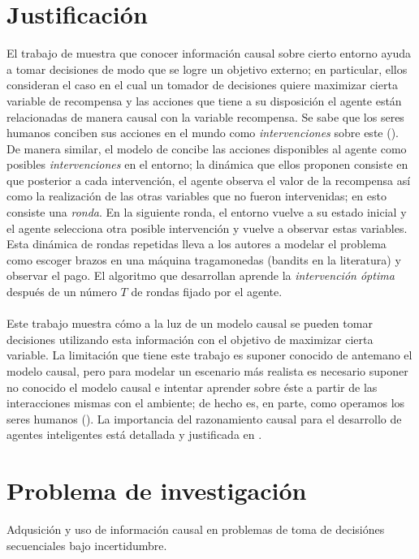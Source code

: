 \documentclass[11pt]{article}
\theoremstyle{plain}
\begin{document}
\section{Justificación}
El trabajo de \cite{lattimoreNIPS2016} muestra que conocer información causal sobre cierto entorno ayuda a tomar decisiones de modo que se logre un objetivo externo; en particular, ellos consideran el caso en el cual un tomador de decisiones quiere maximizar cierta variable de recompensa y las acciones que tiene a su disposición el agente están relacionadas de manera causal con la variable recompensa. Se sabe que los seres humanos conciben sus acciones en el mundo como \textit{intervenciones} sobre este (\cite{hagmayer2009decision}). De manera similar, el modelo de \cite{lattimoreNIPS2016} concibe las acciones disponibles al agente como posibles \textit{intervenciones} en el entorno; la dinámica que ellos proponen consiste en que posterior a cada intervención, el agente observa el valor de la recompensa así como la realización de las otras variables que no fueron intervenidas; en esto consiste una \textit{ronda}. En la siguiente ronda, el entorno vuelve a su estado inicial y el agente selecciona otra posible intervención y vuelve a observar estas variables. Esta dinámica de rondas repetidas lleva a los autores a modelar el problema como escoger brazos en una máquina tragamonedas (bandits en la literatura) y observar el pago. El algoritmo que desarrollan aprende la \textit{intervención óptima} después de un número $T$ de rondas fijado por el agente.\\
\\
Este trabajo muestra cómo a la luz de un modelo causal se pueden tomar decisiones utilizando esta información con el objetivo de maximizar cierta variable. La limitación que tiene este trabajo es suponer conocido de antemano el modelo causal, pero para modelar un escenario más realista es necesario suponer no conocido el modelo causal e intentar aprender sobre éste a partir de las interacciones mismas con el ambiente; de hecho es, en parte, como operamos los seres humanos (\cite{hagmayer2013repeated}). La importancia del razonamiento causal para el desarrollo de agentes inteligentes está detallada y justificada en \cite{lake2017building}.
\section{Problema de investigación}
Adqusición y uso de información causal en problemas de toma de decisiónes secuenciales bajo incertidumbre.
\end{document}
